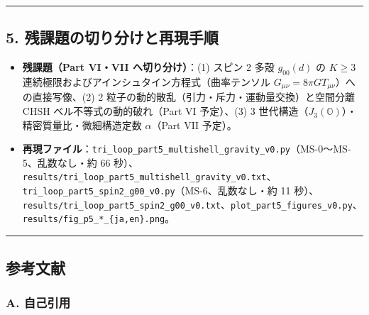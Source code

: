 \documentclass[
  a4paper,
]{ltjsarticle}
\providecommand{\tightlist}{%
  \setlength{\itemsep}{0pt}\setlength{\parskip}{0pt}}
\begin{document}
\begin{center}\rule{0.5\linewidth}{0.5pt}\end{center}

\subsection{5.
残課題の切り分けと再現手順}\label{ux6b8bux8ab2ux984cux306eux5207ux308aux5206ux3051ux3068ux518dux73feux624bux9806}

\begin{itemize}
\tightlist
\item
  \textbf{残課題（Part VI・VII へ切り分け）}：(1) スピン 2 多殻
  \(g_{00}(d)\) の \(K \ge 3\)
  連続極限およびアインシュタイン方程式（曲率テンソル
  \(G_{\mu\nu} = 8\pi G T_{\mu\nu}\)）への直接写像、(2) 2
  粒子の動的散乱（引力・斥力・運動量交換）と空間分離 CHSH
  ベル不等式の動的破れ（Part VI 予定）、(3) 3
  世代構造（\(J_3(\mathbb{O})\)）・精密質量比・微細構造定数
  \(\alpha\)（Part VII 予定）。
\item
  \textbf{再現ファイル}：\texttt{tri\_loop\_part5\_multishell\_gravity\_v0.py}（MS-0〜MS-5、乱数なし・約
  66
  秒）、\texttt{results/tri\_loop\_part5\_multishell\_gravity\_v0.txt}、\texttt{tri\_loop\_part5\_spin2\_g00\_v0.py}（MS-6、乱数なし・約
  11
  秒）、\texttt{results/tri\_loop\_part5\_spin2\_g00\_v0.txt}、\texttt{plot\_part5\_figures\_v0.py}、\texttt{results/fig\_p5\_*\_\{ja,en\}.png}。
\end{itemize}

\begin{center}\rule{0.5\linewidth}{0.5pt}\end{center}

\subsection{参考文献}\label{ux53c2ux8003ux6587ux732e}

\subsubsection{A. 自己引用}\label{a.-ux81eaux5df1ux5f15ux7528}
\end{document}
